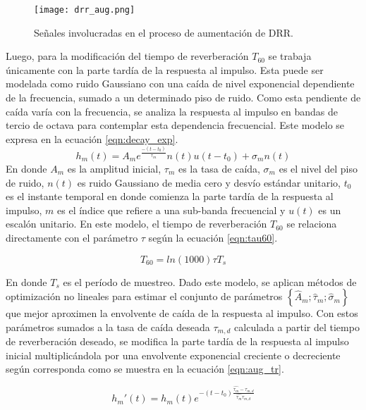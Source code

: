 \begin{figure}[h]
	\centering{}
	\texttt{[image: drr\_aug.png]}
	\caption{Señales involucradas en el proceso de aumentación de DRR.}
	\label{fig:drr_aug}
\end{figure}

Luego, para la modificación del tiempo de reverberación $T_{60}$ se trabaja únicamente con la parte tardía de la respuesta al impulso. Esta puede ser modelada como ruido Gaussiano con una caída de nivel exponencial dependiente de la frecuencia, sumado a un determinado piso de ruido. Como esta pendiente de caída varía con la frecuencia, se analiza la respuesta al impulso en bandas de tercio de octava para contemplar esta dependencia frecuencial. Este modelo se expresa en la ecuación \ref{eqn:decay_exp}. 
\begin{equation}
\label{eqn:decay_exp}
	h_{m}(t) = A_{m} e^{\frac{-(t-t_{0})}{\tau_{m}}}n(t)u(t-t_{0})+\sigma_{m}n(t)
\end{equation} 
En donde $A_{m}$ es la amplitud inicial, $\tau_{m}$ es la tasa de caída, $\sigma_{m}$ es el nivel del piso de ruido, $n(t)$ es ruido Gaussiano de media cero y desvío estándar unitario, $t_{0}$ es el instante temporal en donde comienza la parte tardía de la respuesta al impulso, $m$ es el índice que refiere a una sub-banda frecuencial y $u(t)$ es un escalón unitario. En este modelo, el tiempo de reverberación $T_{60}$ se relaciona directamente con el parámetro $\tau$ según la ecuación \ref{eqn:tau60}.

\begin{equation}
\label{eqn:tau60}
	T_{60} = ln(1000)\tau T_{s}
\end{equation}

En donde $T_{s}$ es el período de muestreo. Dado este modelo, se aplican métodos de optimización no lineales para estimar el conjunto de parámetros $\left \{ \hat{A}_{m}; \hat{\tau}_{m}; \hat{\sigma}_{m} \right \}$ que mejor aproximen la envolvente de caída de la respuesta al impulso. Con estos parámetros sumados a la tasa de caída deseada $\tau_{m,d}$ calculada a partir del tiempo de reverberación deseado, se modifica la parte tardía de la respuesta al impulso inicial multiplicándola por una envolvente exponencial creciente o decreciente según corresponda como se muestra en la ecuación  \ref{eqn:aug_tr}.

\begin{equation}
\label{eqn:aug_tr}
	{h_{m}}'(t) = h_{m}(t) e^{-(t-t_{0})\frac{\hat{\tau_{m}}-\tau_{m,d}}{\hat{\tau_{m}}\tau_{m,d}}}
\end{equation}

